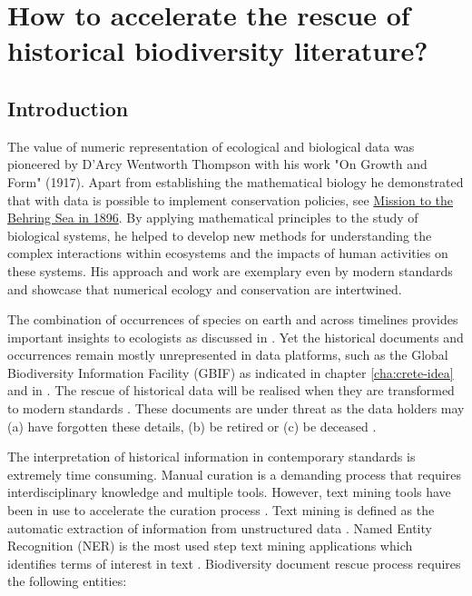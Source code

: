 % 
% 


\chapter{How to accelerate the rescue of historical biodiversity literature?}
\label{cha:deco}


\section{Introduction}
\label{sec:deco-intro}

The value of numeric representation of ecological and biological data was pioneered by D'Arcy Wentworth Thompson
with his work "On Growth and Form" (1917). Apart from establishing the mathematical biology
he demonstrated that with data is possible to implement conservation policies, 
see \href{https://www.biodiversitylibrary.org/item/63749}{Mission to the Behring Sea in 1896}.
By applying mathematical principles to the study of biological systems,
he helped to develop new methods for understanding the complex interactions within
ecosystems and the impacts of human activities on these systems.
His approach and work are exemplary even by modern standards and showcase that 
numerical ecology and conservation are intertwined. 

The combination of occurrences of species on earth and across timelines provides 
important insights to ecologists as discussed in \textcite{levin_problem_1992,bolanakis2024}.
Yet the historical documents and occurrences remain mostly unrepresented in
data platforms, such as the Global Biodiversity Information Facility (GBIF) \parencite{noauthor_gbif_nodate}
as indicated in chapter \ref{cha:crete-idea} and in \textcite{Paragkamian2022}.
The rescue of historical data will be realised when they are transformed to
modern standards \parencite{bowker_biodiversity_2000,Paragkamian2022}.
These documents are under threat as the data holders may
(a) have forgotten these details, (b) be retired or (c) be deceased \parencite{michener_nongeospatial_1997}.

The interpretation of historical information in contemporary standards 
is extremely time consuming. 
Manual curation is a demanding process that requires interdisciplinary 
knowledge and multiple tools.
However, text mining tools have been in use to accelerate the
curation process \parencite{alex_assisted_2008}. Text mining is defined as the
automatic extraction of information from unstructured data
\parencite{hearst_untangling_1999,10.5555/1199003}.
Named Entity Recognition (NER) is the most used step text mining applications
which identifies terms of interest in text \parencite{perera_named_2020}.
Biodiversity document rescue process requires the following entities:

